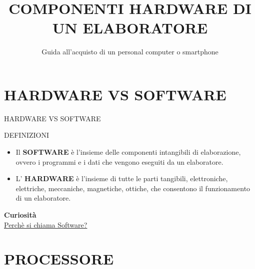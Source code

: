 \documentclass[aspectratio=1610]{beamer}
\title{COMPONENTI HARDWARE DI UN ELABORATORE}
\subtitle{Guida all'acquisto di un personal computer o smartphone}
\date{}
\institute{\textit{
        Fonti:
        \begin{itemize}
            \item[-] \href{https://it.wikipedia.org/wiki/Hardware}{Wikipedia}
            \item[-] \href{https://catalogo.sanoma.it/si-op-104157-dal-bit-all-intelligenza-artificiale.html}{Dal BIT all'INTELLIGENZA ARTIFICIALE}
        \end{itemize}
    }
}
\begin{document}
\begin{frame}
    \titlepage
\end{frame}

\section{HARDWARE VS SOFTWARE}

\begin{frame}{HARDWARE VS SOFTWARE}
    \begin{alertblock}{DEFINIZIONI}
        \begin{minipage}{0.98\linewidth}
            \begin{itemize}
                \justifying
                \item Il \textbf{SOFTWARE} è l'insieme delle componenti intangibili 
                di elaborazione, ovvero i programmi e i dati che vengono eseguiti da un elaboratore.
                \pause
                \item L' \textbf{HARDWARE} è l'insieme di tutte le parti tangibili, 
                elettroniche, elettriche, meccaniche, magnetiche, ottiche, che consentono il funzionamento 
                di un elaboratore.
            \end{itemize}
            \bigskip
            \tiny{\textbf{Curiosità}}\\
            \tiny{\href{https://www.focus.it/tecnologia/digital-life/perche-il-software-si-chiama-cosi}{Perchè si chiama Software?}}
        \end{minipage}
    \end{alertblock}
\end{frame}

\section{PROCESSORE}
\end{document}
